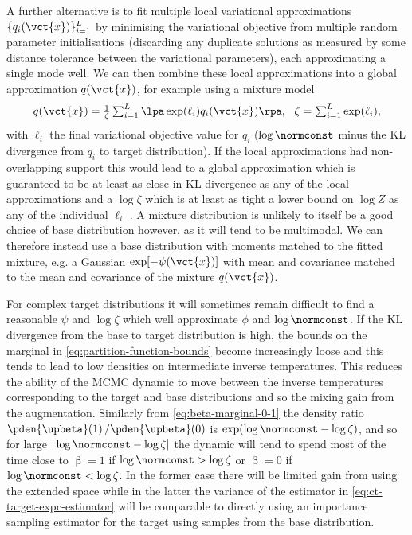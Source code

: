 A further alternative is to fit multiple local variational approximations $\lbrace q_i(\vct{x}) \rbrace_{i=1}^L$ by minimising the variational objective from multiple random parameter initialisations (discarding any duplicate solutions as measured by some distance tolerance between the variational parameters), each approximating a single mode well. We can then combine these local approximations into a global approximation $q(\vct{x})$, for example using a mixture model
\begin{equation}\label{eq:variational-mixture-approx}\textstyle
  q(\vct{x}) = \frac{1}{\zeta} \sum_{i=1}^L \lpa \exp(\ell_i) q_i(\vct{x}) \rpa,~~
  \zeta = \sum_{i=1}^L \exp(\ell_i),
\end{equation}
with $\ell_i$ the final variational objective value for $q_i$ ($\log \normconst$ minus the KL divergence from $q_i$ to target distribution). If the local approximations had non-overlapping support this would lead to a global approximation which is guaranteed to be at least as close in \ac{KL} divergence as any of the local approximations and a $\log \zeta$ which is at least as tight a lower bound on $\log Z$ as any of the individual $\ell_i$ \citep{zobay2009mean}. 
 A mixture distribution is unlikely to itself be a good choice of base distribution however, as it will tend to be multimodal. We can therefore instead use a base distribution with moments matched to the fitted mixture, e.g. a Gaussian $\exp[-\psi(\vct{x})]$ with mean and covariance matched to the mean and covariance of the mixture $q(\vct{x})$.

For complex target distributions it will sometimes remain difficult to find a reasonable $\psi$ and $\log \zeta$ which well approximate $\phi$ and $\log \normconst$. If the \ac{KL} divergence from the base to target distribution is high, the bounds on the marginal in \eqref{eq:partition-function-bounds} become increasingly loose and this tends to lead to low densities on intermediate inverse temperatures. This reduces the ability of the \ac{MCMC} dynamic to move between the inverse temperatures corresponding to the target and base distributions and so the mixing gain from the augmentation. Similarly from \eqref{eq:beta-marginal-0-1} the density ratio $\pden{\upbeta}(1) \,/ \pden{\upbeta}(0)$ is $\exp(\log \normconst - \log \zeta)$, and so for large $|\log\normconst - \log\zeta|$ the dynamic will tend to spend most of the time close to $\upbeta = 1$ if $\log \normconst  > \log \zeta$ or $\upbeta = 0$ if $\log \normconst < \log \zeta$. In the former case there will be limited gain from using the extended space while in the latter the variance of the estimator in \eqref{eq:ct-target-expc-estimator} will be comparable to directly using an importance sampling estimator for the target using samples from the base distribution.

